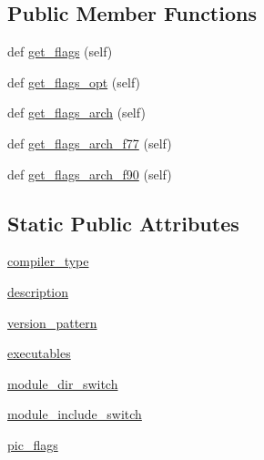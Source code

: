 \subsection*{Public Member Functions}
\begin{DoxyCompactItemize}
\item 
def \hyperlink{classnumpy_1_1distutils_1_1fcompiler_1_1mips_1_1MIPSFCompiler_a12cf550bae91a9accd0d2d1ba0be944d}{get\+\_\+flags} (self)
\item 
def \hyperlink{classnumpy_1_1distutils_1_1fcompiler_1_1mips_1_1MIPSFCompiler_a1252a95e61c1407cfff19d4e88dcf45f}{get\+\_\+flags\+\_\+opt} (self)
\item 
def \hyperlink{classnumpy_1_1distutils_1_1fcompiler_1_1mips_1_1MIPSFCompiler_a0943b2ac1a678d0d17f0922ff67f8ff1}{get\+\_\+flags\+\_\+arch} (self)
\item 
def \hyperlink{classnumpy_1_1distutils_1_1fcompiler_1_1mips_1_1MIPSFCompiler_a1fbf402d3fec096c0d7dcfd8f3856000}{get\+\_\+flags\+\_\+arch\+\_\+f77} (self)
\item 
def \hyperlink{classnumpy_1_1distutils_1_1fcompiler_1_1mips_1_1MIPSFCompiler_a98a59126dd31ba61ab3f20865279d917}{get\+\_\+flags\+\_\+arch\+\_\+f90} (self)
\end{DoxyCompactItemize}
\subsection*{Static Public Attributes}
\begin{DoxyCompactItemize}
\item 
\hyperlink{classnumpy_1_1distutils_1_1fcompiler_1_1mips_1_1MIPSFCompiler_ad9d40d5bc158a48e8da06aec85d003f3}{compiler\+\_\+type}
\item 
\hyperlink{classnumpy_1_1distutils_1_1fcompiler_1_1mips_1_1MIPSFCompiler_acd4ff58cd488c2a753b062f980d72b56}{description}
\item 
\hyperlink{classnumpy_1_1distutils_1_1fcompiler_1_1mips_1_1MIPSFCompiler_a82eda0bdb0ac3be9cac00120657b7253}{version\+\_\+pattern}
\item 
\hyperlink{classnumpy_1_1distutils_1_1fcompiler_1_1mips_1_1MIPSFCompiler_aa9f848c5f35ea68ae69fdd45309332cb}{executables}
\item 
\hyperlink{classnumpy_1_1distutils_1_1fcompiler_1_1mips_1_1MIPSFCompiler_ae8f7eeb12e783ec1838989b50eb18014}{module\+\_\+dir\+\_\+switch}
\item 
\hyperlink{classnumpy_1_1distutils_1_1fcompiler_1_1mips_1_1MIPSFCompiler_a2b9ee8de9df693208292a1fe987f8e19}{module\+\_\+include\+\_\+switch}
\item 
\hyperlink{classnumpy_1_1distutils_1_1fcompiler_1_1mips_1_1MIPSFCompiler_a63563eec08a38be065a0684e990dc781}{pic\+\_\+flags}
\end{DoxyCompactItemize}


